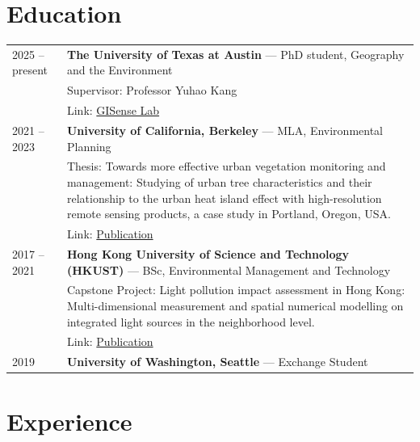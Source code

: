 \documentclass[a4paper,12pt]{article}
\begin{document}
\section{Education}
\begin{tabularx}{\linewidth}{@{}l X@{}}
2025 -- present &
\textbf{The University of Texas at Austin} --- PhD student, Geography and the Environment \\
& Supervisor: Professor Yuhao Kang \\
& Link: \href{https://sites.utexas.edu/gisense/}{GISense Lab}\\[3pt]

2021 -- 2023 &
\textbf{University of California, Berkeley} --- MLA, Environmental Planning \\
& Thesis: Towards more effective urban vegetation monitoring and management: Studying of urban tree characteristics and
their relationship to the urban heat island effect with high-resolution remote sensing products, a case study in
Portland, Oregon, USA. \\
& Link: \href{https://doi.org/10.1016/j.landurbplan.2025.105420}{Publication} \\[3pt]

2017 -- 2021 &
\textbf{Hong Kong University of Science and Technology (HKUST)} --- BSc, Environmental Management and Technology \\
& Capstone Project: Light pollution impact assessment in Hong Kong: Multi-dimensional measurement and spatial numerical
modelling on integrated light sources in the neighborhood level. \\
& Link: \href{https://journals.sagepub.com/doi/abs/10.1177/0958305X221146942}{Publication} \\[3pt]

2019 &
\textbf{University of Washington, Seattle} --- Exchange Student \\
\end{tabularx}

\section{Experience}
\end{document}
